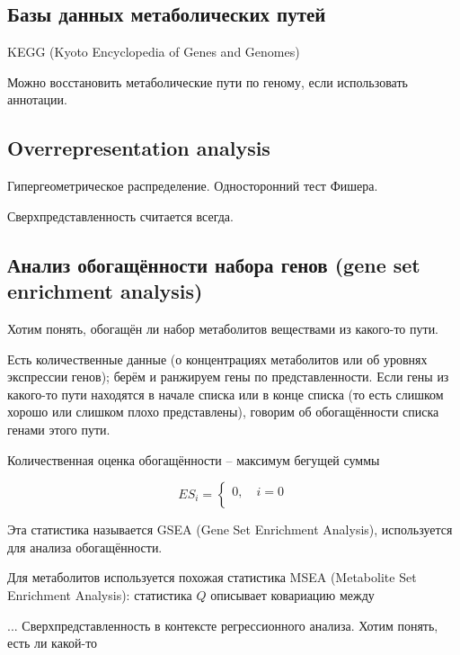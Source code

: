 \documentclass[main.tex]{subfiles}
\begin{document}
\subsection{Базы данных метаболических путей}

KEGG (Kyoto Encyclopedia of Genes and Genomes)

Можно восстановить метаболические пути по геному, если использовать аннотации.

\subsection{Overrepresentation analysis}

Гипергеометрическое распределение.
Односторонний тест Фишера.

Сверхпредставленность считается всегда.

\subsection{Анализ обогащённости набора генов (gene set enrichment analysis)}

Хотим понять, обогащён ли набор метаболитов веществами из какого-то пути.

Есть количественные данные (о концентрациях метаболитов или об уровнях экспрессии генов);
берём и ранжируем гены по представленности.
Если гены из какого-то пути находятся в начале списка или в конце списка (то есть слишком хорошо или слишком плохо представлены), говорим об обогащённости списка генами этого пути.

Количественная оценка обогащённости -- максимум бегущей суммы

\[ ES_i = \begin{cases}
	0, \quad i=0 \\
\end{cases} \]

Эта статистика называется GSEA (Gene Set Enrichment Analysis),  используется для анализа обогащённости.

Для метаболитов используется похожая статистика  MSEA (Metabolite Set Enrichment Analysis):
статистика $ Q $ описывает ковариацию между 

... Сверхпредставленность в контексте регрессионного анализа.
Хотим понять, есть ли какой-то
\end{document}

